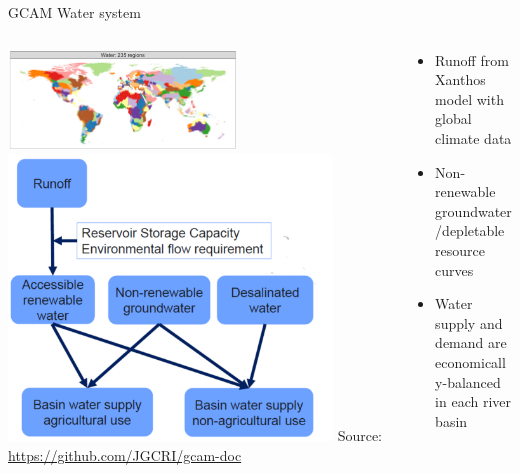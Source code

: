 \begin{frame}{GCAM Water system}
    \begin{columns}[T] 
        \begin{column}{0.60\textwidth} 
            \centering             
            \includegraphics[width=0.6\textwidth]{extraFigs/GCAM_water_system_breakout.png}
            \includegraphics[width=0.85\textwidth]{extraFigs/GCAM_water_system.png}
            \vfill\hfill \tiny{Source: \url{https://github.com/JGCRI/gcam-doc}}
        \end{column}
        \begin{column}{0.38\textwidth}
            \begin{itemize}
                \item Runoff from Xanthos model with global climate data 
                \item Non-renewable groundwater/depletable resource curves 
                \item Water supply and demand are economically-balanced in each river basin
            \end{itemize}
        \end{column}
    \end{columns}
\end{frame}
    
